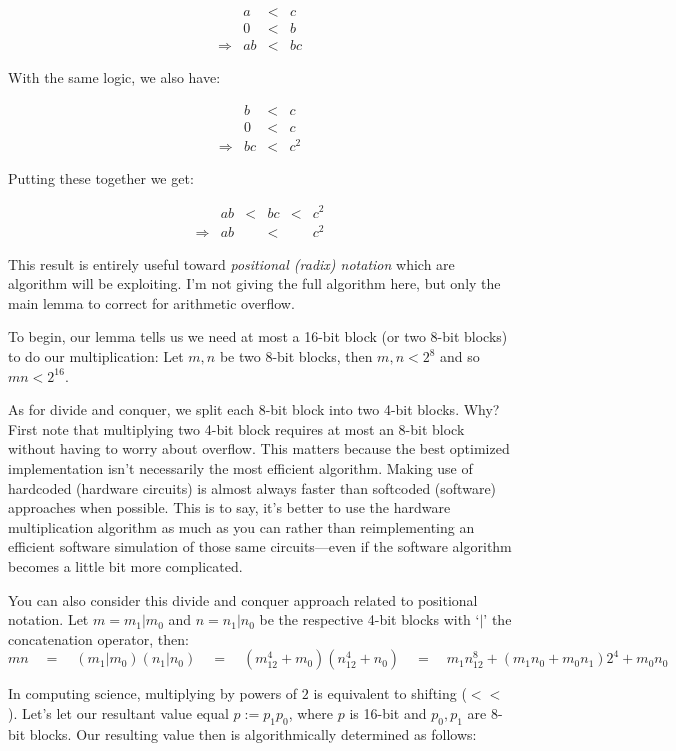 \documentclass[twoside]{article}
\begin{document}
$$ \begin{array}{lrcl}
 & a & < & c \\
 & 0 & < & b \\
\Longrightarrow & ab & < & bc
\end{array} $$

With the same logic, we also have:

$$ \begin{array}{lrcl}
 & b & < & c \\
 & 0 & < & c \\
\Longrightarrow & bc & < & c^2
\end{array} $$

Putting these together we get:

$$ \begin{array}{lrcccl}
 & ab & < & bc & < & c^2 \\
\Longrightarrow & ab && < && c^2
\end{array} $$

This result is entirely useful toward \emph{positional (radix) notation} which are algorithm will be exploiting.
I'm not giving the full algorithm here, but only the main lemma to correct for arithmetic overflow.

To begin, our lemma tells us we need at most a 16-bit block (or two 8-bit blocks) to do our multiplication:
Let $ m,n $ be two 8-bit blocks, then $ m,n < 2^8 $ and so $ mn < 2^{16} $.

As for divide and conquer, we split each 8-bit block into two 4-bit blocks. Why? First note that multiplying two 4-bit
block requires at most an 8-bit block without having to worry about overflow. This matters because the best optimized
implementation isn't necessarily the most efficient algorithm. Making use of hardcoded (hardware circuits) is almost always
faster than softcoded (software) approaches when possible. This is to say, it's better to use the hardware multiplication
algorithm as much as you can rather than reimplementing an efficient software simulation of those same circuits---even if
the software algorithm becomes a little bit more complicated.

You can also consider this divide and conquer approach related to positional notation.
Let $ m=m_1|m_0 $ and $ n=n_1|n_0 $ be the respective 4-bit blocks with `$ | $' the concatenation operator, then:
$$ mn\quad =\quad (m_1|m_0)(n_1|n_0)\quad =\quad (m_12^4+m_0)(n_12^4+n_0)\quad=\quad m_1n_12^8+(m_1n_0+m_0n_1)2^4+m_0n_0 $$

In computing science, multiplying by powers of $ 2 $ is equivalent to shifting ($ << $). Let's let our resultant value equal
$ p:=p_1p_0 $, where $ p $ is 16-bit and $ p_0,p_1 $ are 8-bit blocks. Our resulting value then is algorithmically determined
as follows:
\end{document}
